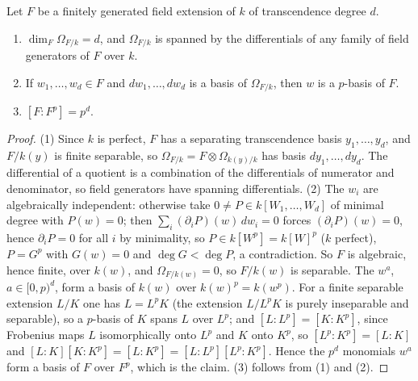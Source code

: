 \begin{lemma}\label{lem:sg-field-pbasis}
\leanok
{}
Let $F$ be a finitely generated field extension of $k$ of transcendence degree $d$.
\begin{enumerate}
\item $\dim_F\Omega_{F/k}=d$, and $\Omega_{F/k}$ is spanned by the differentials of any family of field generators of $F$ over $k$.
\item If $w_1,\dots,w_d\in F$ and $dw_1,\dots,dw_d$ is a basis of $\Omega_{F/k}$, then $w$ is a $p$-basis of $F$.
\item $[F:F^p]=p^d$.
\end{enumerate}
\end{lemma}

\begin{proof}
(1) Since $k$ is perfect, $F$ has a separating transcendence basis $y_1,\dots,y_d$, and $F/k(y)$ is finite separable, so
$\Omega_{F/k}=F\otimes\Omega_{k(y)/k}$ has basis $dy_1,\dots,dy_d$. The differential of a quotient is a combination of the differentials of numerator
and denominator, so field generators have spanning differentials.
(2) The $w_i$ are algebraically independent: otherwise take $0\ne P\in k[W_1,\dots,W_d]$ of minimal degree with $P(w)=0$; then
$\sum_i(\partial_iP)(w)\,dw_i=0$ forces $(\partial_iP)(w)=0$, hence $\partial_iP=0$ for all $i$ by minimality, so $P\in k[W^p]=k[W]^p$ ($k$ perfect),
$P=G^p$ with $G(w)=0$ and $\deg G<\deg P$, a contradiction. So $F$ is algebraic, hence finite, over $k(w)$, and $\Omega_{F/k(w)}=0$, so $F/k(w)$
is separable. The $w^a$, $a\in[0,p)^d$, form a basis of $k(w)$ over $k(w)^p=k(w^p)$. For a finite separable extension $L/K$ one has
$L=L^pK$ (the extension $L/L^pK$ is purely inseparable and separable), so a $p$-basis of $K$ spans $L$ over $L^p$; and $[L:L^p]=[K:K^p]$, since
Frobenius maps $L$ isomorphically onto $L^p$ and $K$ onto $K^p$, so $[L^p:K^p]=[L:K]$ and $[L:K][K:K^p]=[L:K^p]=[L:L^p][L^p:K^p]$. Hence the $p^d$
monomials $w^a$ form a basis of $F$ over $F^p$, which is the claim.
(3) follows from (1) and (2).
\end{proof}

